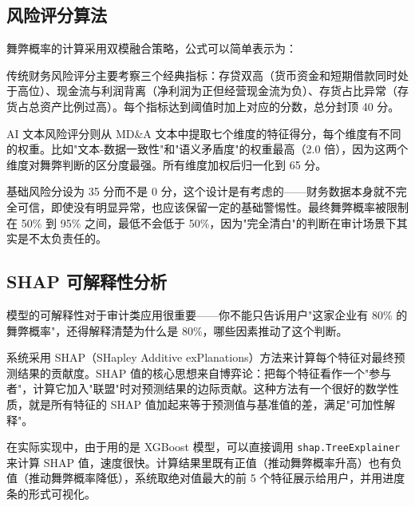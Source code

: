 \documentclass[12pt,a4paper]{ctexart}
\begin{document}
\subsection{风险评分算法}

舞弊概率的计算采用双模融合策略，公式可以简单表示为：

\begin{center}
\end{center}

传统财务风险评分主要考察三个经典指标：存贷双高（货币资金和短期借款同时处于高位）、现金流与利润背离（净利润为正但经营现金流为负）、存货占比异常（存货占总资产比例过高）。每个指标达到阈值时加上对应的分数，总分封顶 40 分。

AI 文本风险评分则从 MD\&A 文本中提取七个维度的特征得分，每个维度有不同的权重。比如"文本-数据一致性"和"语义矛盾度"的权重最高（2.0 倍），因为这两个维度对舞弊判断的区分度最强。所有维度加权后归一化到 65 分。

基础风险分设为 35 分而不是 0 分，这个设计是有考虑的——财务数据本身就不完全可信，即使没有明显异常，也应该保留一定的基础警惕性。最终舞弊概率被限制在 50\% 到 95\% 之间，最低不会低于 50\%，因为"完全清白"的判断在审计场景下其实是不太负责任的。

\subsection{SHAP 可解释性分析}

模型的可解释性对于审计类应用很重要——你不能只告诉用户"这家企业有 80\% 的舞弊概率"，还得解释清楚为什么是 80\%，哪些因素推动了这个判断。

系统采用 SHAP（SHapley Additive exPlanations）方法来计算每个特征对最终预测结果的贡献度。SHAP 值的核心思想来自博弈论：把每个特征看作一个"参与者"，计算它加入"联盟"时对预测结果的边际贡献。这种方法有一个很好的数学性质，就是所有特征的 SHAP 值加起来等于预测值与基准值的差，满足"可加性解释"。

在实际实现中，由于用的是 XGBoost 模型，可以直接调用 \texttt{shap.TreeExplainer} 来计算 SHAP 值，速度很快。计算结果里既有正值（推动舞弊概率升高）也有负值（推动舞弊概率降低），系统取绝对值最大的前 5 个特征展示给用户，并用进度条的形式可视化。

\newpage

\end{document}
